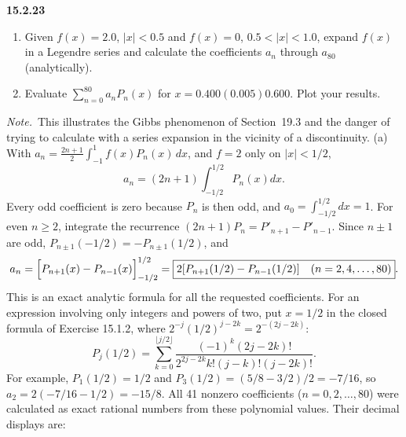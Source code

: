 \par\bigskip
\noindent\textbf{15.2.23}
\begin{enumerate}
\item[(a)] Given $f(x)=2.0$, $|x| < 0.5$ and $f(x)=0$,
$0.5 < |x| < 1.0$, expand $f(x)$ in a Legendre series and
calculate the coefficients $a_{n}$ through $a_{80}$ (analytically).
\item[(b)] Evaluate $\displaystyle\sum_{n=0}^{80}a_{n}P_{n}(x)$ for
$x=0.400(0.005)0.600$. Plot your results.
\end{enumerate}
\par\emph{Note.}~This illustrates the Gibbs phenomenon of
Section~19.3 and the danger of trying to calculate with a series
expansion in the vicinity of a discontinuity.
\solution
(a) With $a_n=\frac{2n+1}2\int_{-1}^1f(x)P_n(x)\,dx$, and $f=2$ only on
$|x|<1/2$,
\[
a_n=(2n+1)\int_{-1/2}^{1/2}P_n(x)dx.
\]
Every odd coefficient is zero because $P_n$ is then odd, and
$a_0=\int_{-1/2}^{1/2}dx=1$.
For even $n\ge2$, integrate the recurrence
$(2n+1)P_n=P'_{n+1}-P'_{n-1}$. Since $n\pm1$ are odd,
$P_{n\pm1}(-1/2)=-P_{n\pm1}(1/2)$, and
\[
a_n=\Bigl[P_{n+1}(x)-P_{n-1}(x)\Bigr]_{-1/2}^{1/2}
=\boxed{2[P_{n+1}(1/2)-P_{n-1}(1/2)]\quad(n=2,4,\ldots,80)}.
\]
This is an exact analytic formula for all the requested coefficients.
For an expression involving only integers and powers of two, put $x=1/2$
in the closed formula of Exercise 15.1.2, where
$2^{-j}(1/2)^{j-2k}=2^{-(2j-2k)}$:
\[
P_j(1/2)=\sum_{k=0}^{\lfloor j/2\rfloor}
\frac{(-1)^k(2j-2k)!}{2^{2j-2k}k!(j-k)!(j-2k)!}.
\]
For example, $P_1(1/2)=1/2$ and $P_3(1/2)=(5/8-3/2)/2=-7/16$, so
$a_2=2(-7/16-1/2)=-15/8$.
All 41 nonzero coefficients ($n=0,2,\ldots,80$) were calculated as exact
rational numbers from these polynomial values. Their decimal displays
are:
